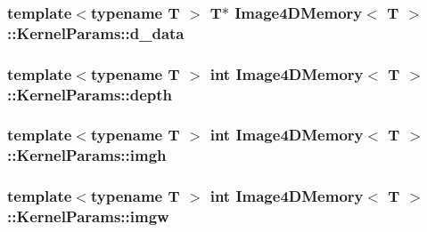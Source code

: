 \subsubsection[{\texorpdfstring{d\+\_\+data}{d_data}}]{\setlength{\rightskip}{0pt plus 5cm}template$<$typename T $>$ T$\ast$ {\bf Image4\+D\+Memory}$<$ T $>$\+::Kernel\+Params\+::d\+\_\+data}\hypertarget{struct_image4_d_memory_1_1_kernel_params_ab938c44c035ecfd8ebdcf2e799392214}{}\label{struct_image4_d_memory_1_1_kernel_params_ab938c44c035ecfd8ebdcf2e799392214}
\subsubsection[{\texorpdfstring{depth}{depth}}]{\setlength{\rightskip}{0pt plus 5cm}template$<$typename T $>$ int {\bf Image4\+D\+Memory}$<$ T $>$\+::Kernel\+Params\+::depth}\hypertarget{struct_image4_d_memory_1_1_kernel_params_a9b5896a9e13cdd7f2c628b2a52d5c880}{}\label{struct_image4_d_memory_1_1_kernel_params_a9b5896a9e13cdd7f2c628b2a52d5c880}
\subsubsection[{\texorpdfstring{imgh}{imgh}}]{\setlength{\rightskip}{0pt plus 5cm}template$<$typename T $>$ int {\bf Image4\+D\+Memory}$<$ T $>$\+::Kernel\+Params\+::imgh}\hypertarget{struct_image4_d_memory_1_1_kernel_params_a0a6639d306e4ed5593c5d497edf6fda6}{}\label{struct_image4_d_memory_1_1_kernel_params_a0a6639d306e4ed5593c5d497edf6fda6}
\subsubsection[{\texorpdfstring{imgw}{imgw}}]{\setlength{\rightskip}{0pt plus 5cm}template$<$typename T $>$ int {\bf Image4\+D\+Memory}$<$ T $>$\+::Kernel\+Params\+::imgw}\hypertarget{struct_image4_d_memory_1_1_kernel_params_aa622909a1be6fbeefc4d05378433f289}{}\label{struct_image4_d_memory_1_1_kernel_params_aa622909a1be6fbeefc4d05378433f289}
